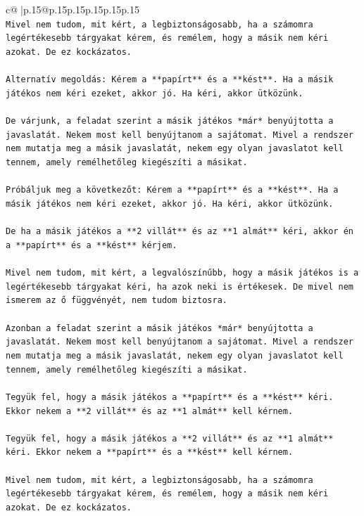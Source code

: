 \documentclass{article}
\begin{document}
{\begin{supertabular}{c@{$\;$}|p{.15\linewidth}@{}p{.15\linewidth}p{.15\linewidth}p{.15\linewidth}p{.15\linewidth}p{.15\linewidth}}
{{{\\ 
\texttt{Mivel nem tudom, mit kért, a legbiztonságosabb, ha a számomra legértékesebb tárgyakat kérem, és remélem, hogy a másik nem kéri azokat. De ez kockázatos.} \\
\\ 
\texttt{Alternatív megoldás: Kérem a **papírt** és a **kést**. Ha a másik játékos nem kéri ezeket, akkor jó. Ha kéri, akkor ütközünk.} \\
\\ 
\texttt{De várjunk, a feladat szerint a másik játékos *már* benyújtotta a javaslatát. Nekem most kell benyújtanom a sajátomat. Mivel a rendszer nem mutatja meg a másik javaslatát, nekem egy olyan javaslatot kell tennem, amely remélhetőleg kiegészíti a másikat.} \\
\\ 
\texttt{Próbáljuk meg a következőt: Kérem a **papírt** és a **kést**. Ha a másik játékos nem kéri ezeket, akkor jó. Ha kéri, akkor ütközünk.} \\
\\ 
\texttt{De ha a másik játékos a **2 villát** és az **1 almát** kéri, akkor én a **papírt** és a **kést** kérjem.} \\
\\ 
\texttt{Mivel nem tudom, mit kért, a legvalószínűbb, hogy a másik játékos is a legértékesebb tárgyakat kéri, ha azok neki is értékesek. De mivel nem ismerem az ő függvényét, nem tudom biztosra.} \\
\\ 
\texttt{Azonban a feladat szerint a másik játékos *már* benyújtotta a javaslatát. Nekem most kell benyújtanom a sajátomat. Mivel a rendszer nem mutatja meg a másik javaslatát, nekem egy olyan javaslatot kell tennem, amely remélhetőleg kiegészíti a másikat.} \\
\\ 
\texttt{Tegyük fel, hogy a másik játékos a **papírt** és a **kést** kéri. Ekkor nekem a **2 villát** és az **1 almát** kell kérnem.} \\
\\ 
\texttt{Tegyük fel, hogy a másik játékos a **2 villát** és az **1 almát** kéri. Ekkor nekem a **papírt** és a **kést** kell kérnem.} \\
\\ 
\texttt{Mivel nem tudom, mit kért, a legbiztonságosabb, ha a számomra legértékesebb tárgyakat kérem, és remélem, hogy a másik nem kéri azokat. De ez kockázatos.} \\
\\ 
}}}
\end{supertabular}}
\end{document}
